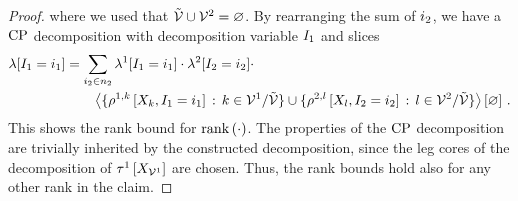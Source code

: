 \begin{proof}
    where we used that $\tilde{\mathcal{V}}\cup\mathcal{V}^{2}=\varnothing$.
    By rearranging the sum of $i_{2}$, we have a $\mathrm{CP}$ decomposition with decomposition variable $I_{1}$ and slices
    \begin{align*}
        \lambda[I_{1}=i_{1}]
        & = \sum_{i_{2}\in n_{2}}  \lambda^{1}[I_{1}=i_{1}] \cdot \lambda^{2}[I_{2}=i_{2}] \cdot \\
        & \quad \quad \left\langle \{\rho^{1,k}\left[X_{k},I_{1}=i_{1}\right] \,:\, k\in\mathcal{V}^{1}/\tilde{\mathcal{V}}\} \cup \{\rho^{2,l}\left[X_{l},I_{2}=i_{2}\right] \,:\, l\in\mathcal{V}^{2}/\tilde{\mathcal{V}}\}\right\rangle \left[ \varnothing \right] \, .
    \end{align*}
    This shows the rank bound for $\mathrm{rank}\left(\cdot\right)$.
    The properties of the $\mathrm{CP}$ decomposition are trivially inherited by the constructed decomposition, since the leg cores of the decomposition of $\tau^{1}\left[X_{\mathcal{V}^{1}}\right]$ are chosen.
    Thus, the rank bounds hold also for any other rank in the claim.
\end{proof}

